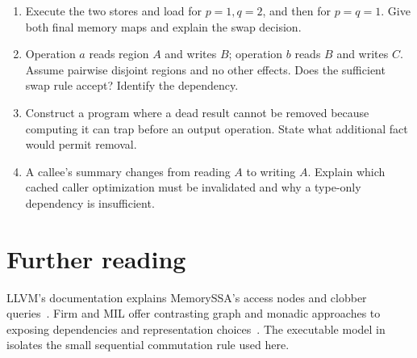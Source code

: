 \begin{enumerate}
\item\label{ex:ch63-stores} Execute the two stores and load for $p=1,q=2$, and then for $p=q=1$.
Give both final memory maps and explain the swap decision.
\item\label{ex:ch63-effects} Operation $a$ reads region $A$ and writes $B$; operation $b$ reads $B$ and writes $C$.
Assume pairwise disjoint regions and no other effects.
Does the sufficient swap rule accept? Identify the dependency.
\item\label{ex:ch63-trap} Construct a program where a dead result cannot be removed because computing it can trap before an output operation.
State what additional fact would permit removal.
\item\label{ex:ch63-summary} A callee's summary changes from reading $A$ to writing $A$.
Explain which cached caller optimization must be invalidated and why a type-only dependency is insufficient.
\end{enumerate}

\section{Further reading}
\label{sec:ch63-reading}

LLVM's documentation explains MemorySSA's access nodes and clobber queries~\cite{llvm-2026-memoryssa}.
Firm and MIL offer contrasting graph and monadic approaches to exposing dependencies and representation choices~\cite{braun-2011-firm,jones-2018-mil}.
The executable  model in  isolates the small sequential commutation rule used here.
